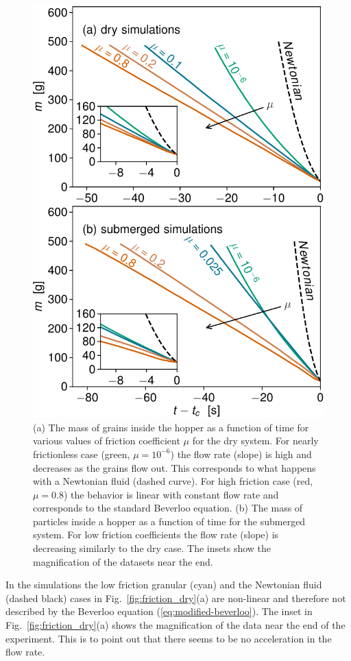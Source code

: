 \documentclass[twoside,twocolumn,9pt]{article}
\providecommand{\DIFaddbegin}{} %
\providecommand{\DIFaddend}{} %
\providecommand{\DIFdelend}{} %
\newcommand{\DIFaddincludegraphics}[2][]{{\color{blue}\fbox{\DIFOincludegraphics[#1]{#2}}}} %
\DeclareRobustCommand{\DIFaddbegin}{\DIFOaddbegin \let\includegraphics\DIFaddincludegraphics} %
\DeclareRobustCommand{\DIFaddend}{\DIFOaddend \let\includegraphics\DIFOincludegraphics} %
\DeclareRobustCommand{\DIFdelend}{\DIFOaddend \let\includegraphics\DIFOincludegraphics} %
\begin{document}
\DIFdelend \DIFaddbegin \begin{figure}[!t] %
 \includegraphics[width=\columnwidth]{fig6-m_vs_t.pdf}
\caption{(a) The mass of grains inside the hopper as a function of time for various values of friction coefficient $\mu$ for the dry system. For nearly frictionless case (green, $\mu=10^{-6}$) the flow rate (slope) is high and decreases as the grains flow out. This corresponds to what happens with a Newtonian fluid (dashed curve). For high friction case (red, $\mu=0.8$) the behavior is linear with constant flow rate and corresponds to the standard Beverloo equation. (b) The mass of particles inside a hopper as a function of time for the submerged system. For low friction coefficients the flow rate (slope) is decreasing similarly to the dry case. The insets show the magnification of the datasets near the end. }
 \label{fig:friction_dry} \label{fig:friction_sub}
\end{figure}
\DIFaddend %
%
In the simulations the low friction granular (cyan) and the Newtonian fluid (dashed black) cases in Fig.~\ref{fig:friction_dry}(a) are non-linear and therefore not described by the Beverloo equation (\ref{eq:modified-beverloo}). 
The inset in Fig.~\ref{fig:friction_dry}(a) shows the magnification of the data near the end of the experiment. This is to point out that there seems to be no acceleration in the flow rate. 
\end{document}
